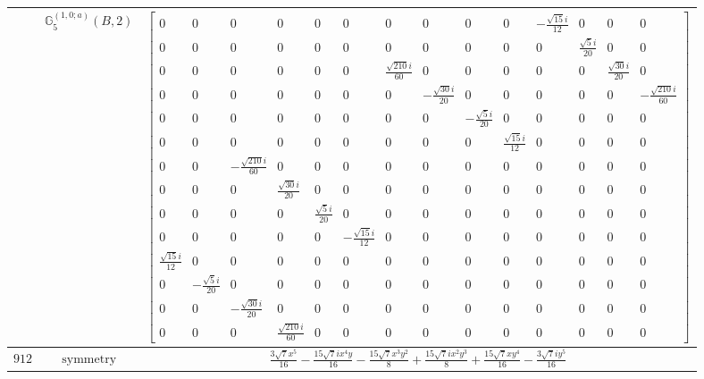 \documentclass[fleqn,8pt,landscape]{jsarticle}
\begin{document}
\begin{longtable}{ccc}
$  $ & $ \mathbb{G}_{5}^{(1,0;a)}(B,2) $ & $ \begin{bmatrix} 0 & 0 & 0 & 0 & 0 & 0 & 0 & 0 & 0 & 0 & - \frac{\sqrt{15} i}{12} & 0 & 0 & 0 \\ 0 & 0 & 0 & 0 & 0 & 0 & 0 & 0 & 0 & 0 & 0 & \frac{\sqrt{5} i}{20} & 0 & 0 \\ 0 & 0 & 0 & 0 & 0 & 0 & \frac{\sqrt{210} i}{60} & 0 & 0 & 0 & 0 & 0 & \frac{\sqrt{30} i}{20} & 0 \\ 0 & 0 & 0 & 0 & 0 & 0 & 0 & - \frac{\sqrt{30} i}{20} & 0 & 0 & 0 & 0 & 0 & - \frac{\sqrt{210} i}{60} \\ 0 & 0 & 0 & 0 & 0 & 0 & 0 & 0 & - \frac{\sqrt{5} i}{20} & 0 & 0 & 0 & 0 & 0 \\ 0 & 0 & 0 & 0 & 0 & 0 & 0 & 0 & 0 & \frac{\sqrt{15} i}{12} & 0 & 0 & 0 & 0 \\ 0 & 0 & - \frac{\sqrt{210} i}{60} & 0 & 0 & 0 & 0 & 0 & 0 & 0 & 0 & 0 & 0 & 0 \\ 0 & 0 & 0 & \frac{\sqrt{30} i}{20} & 0 & 0 & 0 & 0 & 0 & 0 & 0 & 0 & 0 & 0 \\ 0 & 0 & 0 & 0 & \frac{\sqrt{5} i}{20} & 0 & 0 & 0 & 0 & 0 & 0 & 0 & 0 & 0 \\ 0 & 0 & 0 & 0 & 0 & - \frac{\sqrt{15} i}{12} & 0 & 0 & 0 & 0 & 0 & 0 & 0 & 0 \\ \frac{\sqrt{15} i}{12} & 0 & 0 & 0 & 0 & 0 & 0 & 0 & 0 & 0 & 0 & 0 & 0 & 0 \\ 0 & - \frac{\sqrt{5} i}{20} & 0 & 0 & 0 & 0 & 0 & 0 & 0 & 0 & 0 & 0 & 0 & 0 \\ 0 & 0 & - \frac{\sqrt{30} i}{20} & 0 & 0 & 0 & 0 & 0 & 0 & 0 & 0 & 0 & 0 & 0 \\ 0 & 0 & 0 & \frac{\sqrt{210} i}{60} & 0 & 0 & 0 & 0 & 0 & 0 & 0 & 0 & 0 & 0 \end{bmatrix} $ \\ \hline
$ 912 $ & $ \text{symmetry} $ & $ \frac{3 \sqrt{7} x^{5}}{16} - \frac{15 \sqrt{7} i x^{4} y}{16} - \frac{15 \sqrt{7} x^{3} y^{2}}{8} + \frac{15 \sqrt{7} i x^{2} y^{3}}{8} + \frac{15 \sqrt{7} x y^{4}}{16} - \frac{3 \sqrt{7} i y^{5}}{16} $ \\

\end{longtable}
\end{document}
